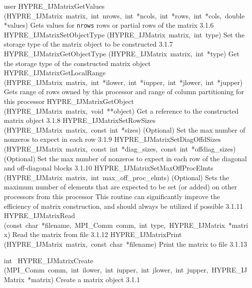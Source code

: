 \documentclass{article}
\begin{document}
\begin{cxxentry}
\begin{cxxentry}
\begin{cxxnames}
{user}
        {}
\label{cxx.3.1.16}
        {HYPRE\_IJMatrixGetValues}
        {(HYPRE\_IJMatrix\ matrix,\ int\ nrows,\ int\ *ncols,\ int\ *rows,\ int\ *cols,\ double\ *values)}
        {
Gets values for {\tt nrows} rows or partial rows of the matrix}
        {3.1.6}
        {HYPRE\_IJMatrixSetObjectType}
        {(HYPRE\_IJMatrix\ matrix,\ int\ type)}
        {
Set the storage type of the matrix object to be constructed}
        {3.1.7}
        {HYPRE\_IJMatrixGetObjectType}
        {(HYPRE\_IJMatrix\ matrix,\ int\ *type)}
        {
Get the storage type of the constructed matrix object}
        {}
\label{cxx.3.1.17}
        {HYPRE\_IJMatrixGetLocalRange}
        {(HYPRE\_IJMatrix\ matrix,\ int\ *ilower,\ int\ *iupper,\ int\ *jlower,\ int\ *jupper)}
        {
Gets range of rows owned by this processor and range
of column partitioning for this processor}
        {}
\label{cxx.3.1.18}
        {HYPRE\_IJMatrixGetObject}
        {(HYPRE\_IJMatrix\ matrix,\ void\ **object)}
        {
Get a reference to the constructed matrix object}
        {3.1.8}
        {HYPRE\_IJMatrixSetRowSizes}
        {(HYPRE\_IJMatrix\ matrix,\ const\ int\ *sizes)}
        {
(Optional) Set the max number of nonzeros to expect in each row}
        {3.1.9}
        {HYPRE\_IJMatrixSetDiagOffdSizes}
        {(HYPRE\_IJMatrix\ matrix,\ const\ int\ *diag\_sizes,\ const\ int\ *offdiag\_sizes)}
        {
(Optional) Set the max number of nonzeros to expect in each row of
the diagonal and off-diagonal blocks}
        {3.1.10}
        {HYPRE\_IJMatrixSetMaxOffProcElmts}
        {(HYPRE\_IJMatrix\ matrix,\ int\ max\_off\_proc\_elmts)}
        {
(Optional) Sets the maximum number of elements that are expected to be set
(or added) on other processors from this processor
This routine can significantly improve the efficiency of matrix
construction, and should always be utilized if possible}
        {3.1.11}
        {HYPRE\_IJMatrixRead}
        {(const\ char\ *filename,\ MPI\_Comm\ comm,\ int\ type,\ HYPRE\_IJMatrix\ *matrix)}
        {
Read the matrix from file}
        {3.1.12}
        {HYPRE\_IJMatrixPrint}
        {(HYPRE\_IJMatrix\ matrix,\ const\ char\ *filename)}
        {
Print the matrix to file}
        {3.1.13}
\end{cxxnames}
\begin{cxxfunction}
{int\ }
        {HYPRE\_IJMatrixCreate}
        {(MPI\_Comm\ comm,\ int\ ilower,\ int\ iupper,\ int\ jlower,\ int\ jupper,\ HYPRE\_IJMatrix\ *matrix)}
        {
Create a matrix object}
        {3.1.1}
\begin{cxxdoc}


\end{cxxdoc}
\end{cxxfunction}
\end{cxxentry}
\end{cxxentry}
\end{document}
